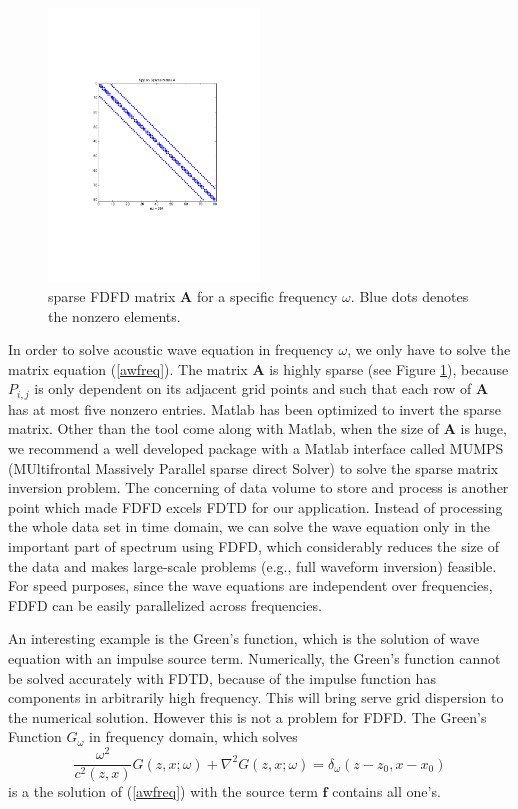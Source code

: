 \documentclass[11pt]{article}
\newcommand{\bA}{\boldsymbol{A}}
\newcommand{\bff}{\boldsymbol{f}}
\theoremstyle{plain}
\theoremstyle{definition}
\theoremstyle{remark}
\numberwithin{equation}{section}
\begin{document}
  \begin{figure}
  \centering
  \includegraphics[width=0.5\textwidth]{Fig/FDFDMatrixA.pdf}
  \caption{sparse FDFD matrix $\bA$ for a specific frequency $\omega$. Blue dots denotes the nonzero elements.}
  \label{fig:SparseA}
  \end{figure}
  In order to solve acoustic wave equation in frequency $\omega$, we only have to solve the matrix equation (\ref{awfreq}). The 
  matrix $\bA$ is highly sparse (see Figure \ref{fig:SparseA}), because $P_{i,j}$ is only dependent on its adjacent grid points and such that each row of $\bA$ has at most five nonzero entries.
  Matlab has been optimized to invert the sparse matrix. Other than the tool come along with Matlab, when the size of $\bA$ is huge, we recommend a well developed package with a Matlab interface called MUMPS (MUltifrontal Massively Parallel sparse direct Solver) to solve the sparse matrix inversion problem. 
 The concerning of data volume to store and process is another point which made FDFD excels FDTD for our application. Instead of processing the whole data set in time domain, we can solve the wave equation only in the important part of spectrum using FDFD, which considerably reduces the size of the data and makes large-scale problems (e.g., full waveform inversion) feasible. For speed purposes, since the wave equations are independent over frequencies, FDFD can be easily parallelized across frequencies.

An interesting example is the Green's function, which is the solution of wave equation with an impulse source term. Numerically,
the Green's function cannot be solved accurately with FDTD, because of the impulse function has components in arbitrarily high
frequency. This will bring serve grid dispersion to the numerical solution. However this is not a problem for FDFD. The Green's Function 
$G_{\omega}$ in frequency domain, which solves  
  \begin{equation}
  \frac{\omega^2}{c^2(z, x)}G(z, x;\omega) + \nabla^2 G(z, x;\omega) = \delta_{\omega}(z-z_0, x-x_0)
  \end{equation}
  is a the solution of (\ref{awfreq}) with the source term $\bff$ contains all one's.
  
\end{document}
